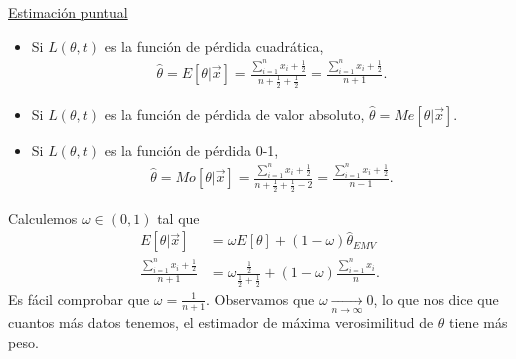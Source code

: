 \underline{Estimación puntual}
\begin{itemize}
    \item Si $L(\theta,t)$ es la función de pérdida cuadrática,
          \begin{align*}
              \widehat{\theta} = E[\theta |  \vec{x}] = \frac{\sum_{i=1}^{n} x_i + \frac{1}{2}}{n + \frac{1}{2} + \frac{1}{2}} = \frac{\sum_{i=1}^{n} x_i + \frac{1}{2}}{n + 1}.
          \end{align*}
    \item Si $L(\theta,t)$ es la función de pérdida de valor absoluto, $\widehat{\theta} = Me[\theta | \vec{x}]$.
    \item Si $L(\theta,t)$ es la función de pérdida 0-1,
          \begin{align*}
              \widehat{\theta} = Mo[\theta | \vec{x}] = \frac{\sum_{i=1}^{n} x_i + \frac{1}{2}}{n + \frac{1}{2} +\frac{1}{2} - 2} = \frac{\sum_{i=1}^{n} x_i + \frac{1}{2}}{n - 1}.
          \end{align*}
\end{itemize}
Calculemos $\omega \in (0,1)$ tal que
\begin{align*}
    E[\theta | \vec{x}]                           & = \omega E[\theta] + (1 - \omega) \widehat{\theta}_{EMV}                                          \\
    \frac{\sum_{i=1}^{n} x_i +\frac{1}{2}}{n + 1} & = \omega \frac{\frac{1}{2}}{\frac{1}{2} + \frac{1}{2}} + (1-\omega) \frac{\sum_{i=1}^{n} x_i}{n}.
\end{align*}
Es fácil comprobar que $\omega = \frac{1}{n+1}$. Observamos que $\omega \xrightarrow[n \to \infty]{} 0$, lo que nos dice que cuantos más datos tenemos, el estimador de máxima verosimilitud de $\theta$ tiene más peso.


